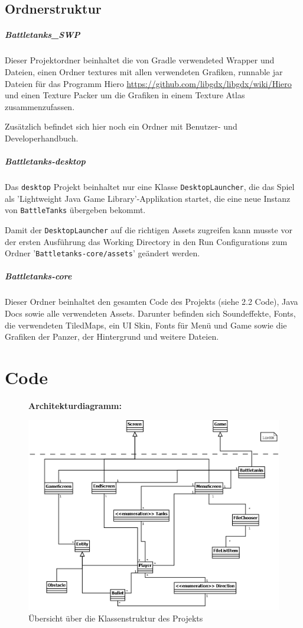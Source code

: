 \documentclass[10pt]{report}
\def\code#1{\texttt{#1}}
\begin{document}
\subsection{Ordnerstruktur}
\subparagraph{Battletanks\_SWP} Dieser Projektordner beinhaltet die von Gradle verwendeted Wrapper und Dateien, einen Ordner textures mit allen verwendeten Grafiken, runnable jar Dateien für das Programm Hiero \url{https://github.com/libgdx/libgdx/wiki/Hiero} und einen Texture Packer um die Grafiken in einem Texture Atlas zusammenzufassen.

Zusätzlich befindet sich hier noch ein Ordner mit Benutzer- und Developerhandbuch.

\subparagraph{Battletanks-desktop}
Das  \code{desktop} Projekt beinhaltet nur eine Klasse \code{DesktopLauncher}, die das Spiel als 'Lightweight Java Game Library'-Applikation startet, die eine neue Instanz von \code{BattleTanks} übergeben bekommt.

Damit der \code{DesktopLauncher} auf die richtigen Assets zugreifen kann musste vor der ersten Ausführung das Working Directory in den Run Configurations zum Ordner '\code{Battletanks-core/assets}' geändert werden.

\subparagraph{Battletanks-core}
Dieser Ordner beinhaltet den gesamten Code des Projekts (siehe 2.2 Code), Java Docs sowie alle verwendeten Assets. Darunter befinden sich Soundeffekte, Fonts, die verwendeten TiledMaps, ein UI Skin, Fonts für Menü und Game sowie die Grafiken der Panzer, der Hintergrund und weitere Dateien.



\newpage
\section{Code}
\begin{figure}[H]
  \textbf{Architekturdiagramm:}\par\medskip
  \centering
\includegraphics[width=15cm]{architekturdiagramm.png}
\caption{Übersicht über die Klassenstruktur des Projekts}
\end{figure}
\begin{center}\end{center}
\end{document}
